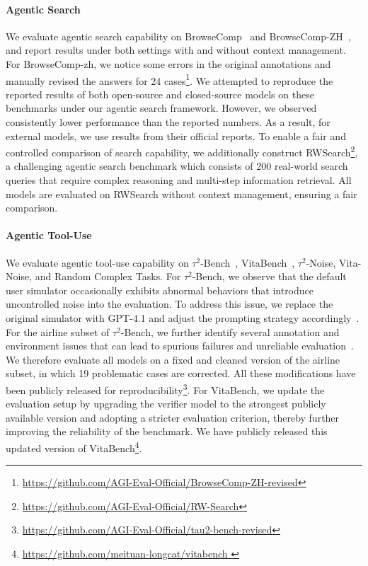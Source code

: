 \documentclass{article}
\begin{document}
\paragraph{Agentic Search}
We evaluate agentic search capability on BrowseComp~\citep{BrowseComp} and BrowseComp-ZH~\citep{BrowseComp-zh}, and report results under both settings with and without context management.
For BrowseComp-zh, we notice some errors in the original annotations and manually revised the answers for 24 cases\footnote{\url{https://github.com/AGI-Eval-Official/BrowseComp-ZH-revised}}.
We attempted to reproduce the reported results of both open-source and closed-source models on these benchmarks under our agentic search framework.
However, we observed consistently lower performance than the reported numbers.
As a result, for external models, we use results from their official reports.
To enable a fair and controlled comparison of search capability, we additionally construct RWSearch\footnote{\url{https://github.com/AGI-Eval-Official/RW-Search}}, a challenging agentic search benchmark which consists of 200 real-world search queries that require complex reasoning and multi-step information retrieval.
All models are evaluated on RWSearch without context management, ensuring a fair comparison.

\paragraph{Agentic Tool-Use}
We evaluate agentic tool-use capability on $\tau^2$-Bench~\citep{tau2-bench}, VitaBench~\citep{vita-bench}, $\tau^2$-Noise, Vita-Noise, and Random Complex Tasks. 
For $\tau^2$-Bench, we observe that the default user simulator occasionally exhibits abnormal behaviors that introduce uncontrolled noise into the evaluation. 
To address this issue, we replace the original simulator with GPT-4.1 and adjust the prompting strategy accordingly~\citep{Claude-Opus-4.5, GPT-5.2, Gemini3}. 
For the airline subset of $\tau^2$-Bench, we further identify several annotation and environment issues that can lead to spurious failures and unreliable evaluation~\citep{Claude-Opus-4.5, GPT-5.2, Gemini3}. 
We therefore evaluate all models on a fixed and cleaned version of the airline subset, in which 19 problematic cases are corrected.
All these modifications have been publicly released for reproducibility\footnote{\url{https://github.com/AGI-Eval-Official/tau2-bench-revised}}.
For VitaBench, we update the evaluation setup by upgrading the verifier model to the strongest publicly available version and adopting a stricter evaluation criterion, thereby further improving the reliability of the benchmark.
We have publicly released this updated version of VitaBench\footnote{\url{https://github.com/meituan-longcat/vitabench }}.
\end{document}
